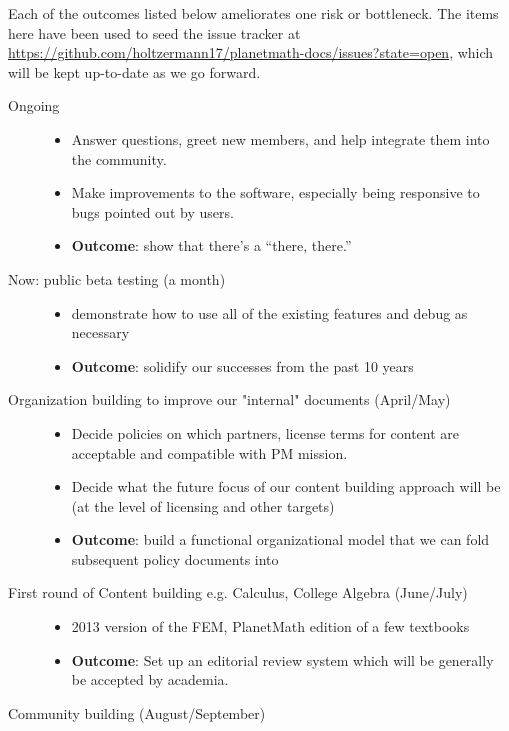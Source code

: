 Each of the outcomes listed below ameliorates one risk or bottleneck.
The items here have been used to seed the issue tracker at
\url{https://github.com/holtzermann17/planetmath-docs/issues?state=open},
which will be kept up-to-date as we go forward.
\begin{description}
\item[Ongoing] \quad
\begin{itemize}
\item Answer questions, greet new members, and help integrate them into the community.
\item Make improvements to the software, especially being responsive to bugs pointed out by users.
\item {\bf Outcome}: show that there's a ``there, there.''
\end{itemize}
\item[Now: public beta testing (a month)] \quad 
\begin{itemize}
\item demonstrate how to use all of the existing features and debug as necessary
\item {\bf Outcome}: solidify our successes from the past 10 years
\end{itemize}
%
\item[Organization building to improve our "internal" documents (April/May)] \quad 
\begin{itemize}
\item Decide policies on which partners, license terms for content are acceptable and compatible with PM mission.
\item Decide what the future focus of our content building approach will be (at the level of licensing and other targets)
\item {\bf Outcome}: build a functional organizational model that we can fold subsequent policy documents into
\end{itemize}
%
\item[First round of Content building e.g. Calculus, College Algebra (June/July)] \quad 
\begin{itemize}
\item 2013 version of the FEM, PlanetMath edition of a few textbooks
\item {\bf Outcome}: Set up an editorial review system which will be generally be accepted by academia.
\end{itemize}
%
\item[Community building (August/September)] \quad 
\begin{itemize}

\end{itemize}
\end{description}
